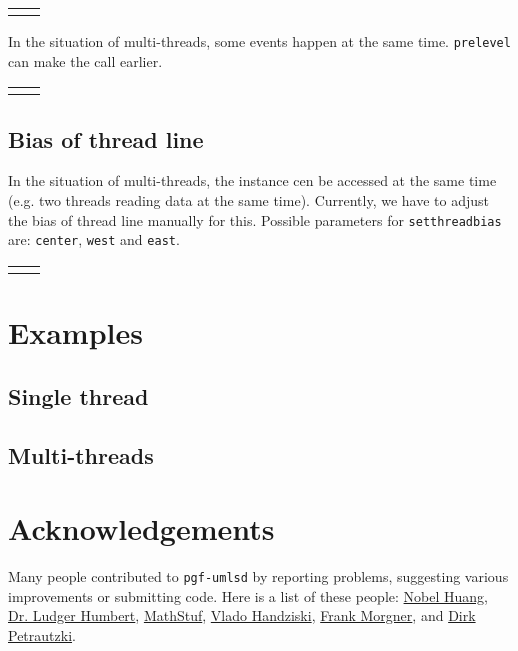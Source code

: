 \documentclass{article}
\newcommand{\demo}[2][1]{
  \begin{center}
  \begin{tabular}{cc}
    \begin{minipage}{.49\linewidth}
      \centering
      \resizebox{#1\linewidth}{!}{
        
      }
    \end{minipage}
    &
    \begin{minipage}{.45\linewidth}
      
    \end{minipage}
  \end{tabular}
  \end{center}
}
\newcommand{\example}[2][1]{
  \begin{center}  
    \resizebox{#1\linewidth}{!}{
      
    }
  \end{center}
  
}
\begin{document}
\demo[0.6]{postlevel}

In the situation of multi-threads, some events happen at the same
time. \texttt{prelevel} can make the call earlier.

\demo[0.6]{prelevel}

\subsection{Bias of thread line}
In the situation of multi-threads, the instance cen be accessed at the
same time (e.g. two threads reading data at the same time). Currently,
we have to adjust the bias of thread line manually for this. Possible
parameters for \texttt{setthreadbias} are: \texttt{center},
\texttt{west} and \texttt{east}.

\demo[0.8]{threadbias}

\section{Examples}
\subsection{Single thread}
\example[0.8]{single-thread-example}

\subsection{Multi-threads}
\example[0.8]{multi-threads-example}

\section{Acknowledgements}
Many people contributed to \texttt{pgf-umlsd} by reporting problems,
suggesting various improvements or submitting code. Here is a list of
these people:
\href{mailto:nobel1984@gmail.com}{Nobel Huang},
\href{mailto:humbert@uni-wuppertal.de}{Dr. Ludger Humbert},
\href{mailto:MathStuf@gmail.com}{MathStuf},
\href{mailto:vlado.handziski@gmail.com}{Vlado Handziski},
\href{mailto:frankmorgner@gmail.com}{Frank Morgner},
and \href{mailto:petrautzki@hs-coburg.de}{Dirk Petrautzki}.
\end{document}
